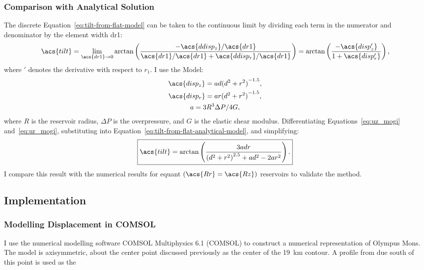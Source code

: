 \subsubsection{Comparison with Analytical Solution}
The discrete Equation~\eqref{eq:tilt-from-flat-model} can be taken to the continuous limit by dividing each term in the numerator and denominator by the element width \acs{dr1}:
\begin{equation}
\acs{tilt}
    = \lim_{\acs{dr1}\to0} 
    \arctan\left(\dfrac{-\acs{ddisp_z}/\acs{dr1}}{\acs{dr1}/\acs{dr1}
    + \acs{ddisp_r}/\acs{dr1}}\right) = 
    \arctan\left(\dfrac{-\acs{disp_z'}}{1+\acs{disp_r'}}\right),\label{eq:tilt-from-flat-analytical-model}
\end{equation}
where $'$ denotes the derivative with respect to $r_1$. I use the \textcite{mogi_relations_1958} Model:
\begin{gather}
    \acs{disp_z} = ad{(d^2+r^2)}^{-1.5},\label{eq:uz_mogi}\\
    \acs{disp_r} = ar{(d^2+r^2)}^{-1.5},\label{eq:ur_mogi}\\
    a = {3R^3\Delta P}/{4G},\nonumber
\end{gather}
where $R$ is the reservoir radius, $\Delta P$ is the overpressure, and $G$ is the elastic shear modulus. Differentiating Equations~\eqref{eq:uz_mogi} and~\eqref{eq:ur_mogi}, substituting into Equation~\eqref{eq:tilt-from-flat-analytical-model}, and simplifying:
\begin{equation}
    \boxed{\acs{tilt} = \arctan\left(\frac{3adr}{{(d^2+r^2)}^{2.5}+ad^2-2ar^2}\right).}\label{eq:tilt-from-mogi-model}
\end{equation}
I compare this result with the numerical results for equant $(\acs{Rr}=\acs{Rz})$ reservoirs to validate the method.

\subsection{Implementation}

\subsubsection{Modelling Displacement in COMSOL}

I use the numerical modelling software COMSOL Multiphysics 6.1 (COMSOL) to construct a numerical representation of Olympus Mons. The model is axisymmetric, about the center point discussed previously as the center of the \qty{19}{\km} contour. A profile from due south of this point is used as the 

